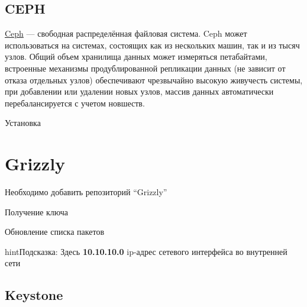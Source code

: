 \documentclass[letterpaper,10pt,russian]{sphinxmanual}
\begin{document}
\section{CEPH}
\label{index:ceph}
\href{http://ceph.com}{Ceph} — свободная распределённая файловая система. Ceph может использоваться на системах, состоящих как из нескольких машин, так и из тысяч узлов. Общий объем хранилища данных может измеряться петабайтами, встроенные механизмы продублированной репликации данных (не зависит от отказа отдельных узлов) обеспечивают чрезвычайно высокую живучесть системы, при добавлении или удалении новых узлов, массив данных автоматически перебалансируется с учетом новшеств.

Установка




\chapter{Grizzly}
\label{index:grizzly}
Необходимо добавить репозиторий ``Grizzly''


Получение ключа


Обновление списка пакетов




\begin{notice}{hint}{Подсказка:}
Здесь \textbf{10.10.10.0} ip-адрес сетевого интерфейса во внутренней сети
\end{notice}




\section{Keystone}
\label{index:keystone}
\end{document}
